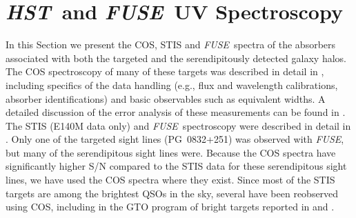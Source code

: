 \documentclass[twocolumn,twocolappendix,tighten,times]{aastex6}
\newcommand{\fuse}{{\sl FUSE}}
\newcommand{\hst}{{\sl HST}}
\begin{document}




\bigskip
\section{\hst\ and \fuse\ UV Spectroscopy}
\label{absorbers}

In this Section we present the COS, STIS and \fuse\ spectra of the
absorbers associated with both the targeted and the serendipitously
detected galaxy halos. The COS spectroscopy of many of these targets
was described in detail in \citet{danforth16}, including specifics
of the data handling (e.g., flux and wavelength calibrations,
absorber identifications) and basic observables such as equivalent widths. 
A detailed discussion of the error analysis of these measurements can be found 
in \citet{keeney13}. The STIS (E140M data only) and \fuse\ spectroscopy were 
described in detail in \citet{tilton12}. Only one of the targeted sight lines 
(PG~0832+251) was observed with \fuse, but many of the serendipitous sight lines 
were. Because the COS spectra have significantly higher S/N compared to the STIS 
data for these serendipitous sight lines, we have used the COS spectra where
they exist. Since most of the STIS targets are among the brightest
QSOs in the sky, several have been reobserved using COS, including in
the GTO program of bright targets reported in \citet{savage14} and 
\citet{danforth16}. 
\end{document}
